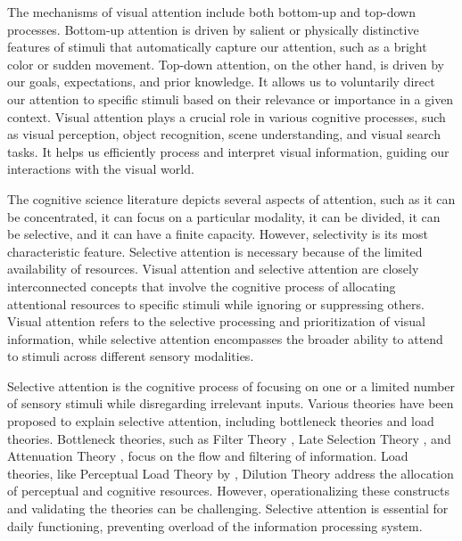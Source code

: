 The mechanisms of visual attention include both bottom-up and top-down processes. Bottom-up attention is driven by salient or physically distinctive features of stimuli that automatically capture our attention, such as a bright color or sudden movement. Top-down attention, on the other hand, is driven by our goals, expectations, and prior knowledge. It allows us to voluntarily direct our attention to specific stimuli based on their relevance or importance in a given context. Visual attention plays a crucial role in various cognitive processes, such as visual perception, object recognition, scene understanding, and visual search tasks. It helps us efficiently process and interpret visual information, guiding our interactions with the visual world.

The cognitive science literature depicts several aspects of attention, such as it can be concentrated, it can focus on a particular modality, it can be divided, it can be selective, and it can have a finite capacity. However, selectivity is its most characteristic feature. Selective attention is necessary because of the limited availability of resources. Visual attention and selective attention are closely interconnected concepts that involve the cognitive process of allocating attentional resources to specific stimuli while ignoring or suppressing others. Visual attention refers to the selective processing and prioritization of visual information, while selective attention encompasses the broader ability to attend to stimuli across different sensory modalities.

Selective attention is the cognitive process of focusing on one or a limited number of sensory stimuli while disregarding irrelevant inputs. Various theories have been proposed to explain selective attention, including bottleneck theories and load theories. Bottleneck theories, such as Filter Theory \citep{broadbent1958perception}, Late Selection Theory \citep{deutsch1963attention}, and Attenuation Theory \citep{treisman1964selective}, focus on the flow and filtering of information. Load theories, like Perceptual Load Theory by \citet{lavie1994perceptual}, Dilution Theory \citep{tsal2010diluting} address the allocation of perceptual and cognitive resources. However, operationalizing these constructs and validating the theories can be challenging. Selective attention is essential for daily functioning, preventing overload of the information processing system. 

